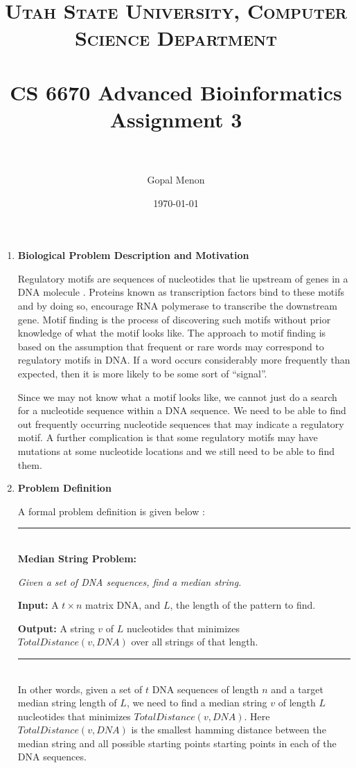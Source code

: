 \documentclass[paper=a4, fontsize=11pt]{scrartcl} %
\title{	
\normalfont \normalsize 
\textsc{Utah State University, Computer Science Department} \\ [25pt] %
\horrule{0.5pt} \\[0.4cm] %
\huge CS 6670 Advanced Bioinformatics\\Assignment 3 \\ %
\horrule{2pt} \\[0.5cm] %
}
\author{Gopal Menon} %
\date{\normalsize\today} %
\numberwithin{equation}{section} %
\numberwithin{figure}{section} %
\numberwithin{table}{section} %
\newcommand{\horrule}[1]{\rule{\linewidth}{#1}} %
\begin{document}
\maketitle %

\begin{enumerate}

\item \textbf{Biological Problem Description and Motivation}

Regulatory motifs are sequences of nucleotides that lie upstream of genes in a DNA molecule \cite{pevzner}. Proteins known as transcription factors bind to these motifs and by doing so, encourage RNA polymerase to transcribe the downstream gene. Motif finding is the process of discovering such motifs without prior knowledge of what the motif looks like. The approach to motif finding is based on the assumption that frequent or rare words may correspond to regulatory motifs in DNA. If a word occurs considerably more frequently than expected, then it is more likely to be some sort of \enquote{signal}.

Since we may not know what a motif looks like, we cannot just do a search for a nucleotide sequence within a DNA sequence. We need to be able to find out frequently occurring nucleotide sequences that may indicate a regulatory motif. A further complication is that some regulatory motifs may have mutations at some nucleotide locations and we still need to be able to find them.

\item \textbf{Problem Definition}

A formal problem definition is given below \cite{pevzner}:

\horrule{0.5pt} \\[0.4cm]
\textbf{Median String Problem:}

\textit{Given a set of DNA sequences, find a median string.}

\textbf{Input:} A $t \times n$ matrix DNA, and $L$, the length of the pattern to find.

\textbf{Output:} A string $v$ of $L$ nucleotides that minimizes $TotalDistance(v, DNA)$ over all strings of that length.

\horrule{0.5pt} \\[0.4cm]
In other words, given a set of $t$ DNA sequences of length $n$ and a target median string length of $L$, we need to find a median string $v$ of length $L$ nucleotides that minimizes $TotalDistance(v, DNA)$. Here $TotalDistance(v, DNA)$ is the smallest hamming distance between the median string and all possible starting points starting points in each of the DNA sequences. 


\end{enumerate}
\end{document}
